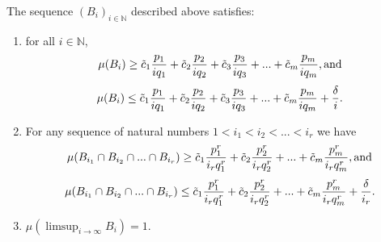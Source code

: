\documentclass[12pt]{article}
\begin{document}
\begin{lemma}\label{Bi lemma}
    The sequence $(B_i)_{i \in \mathbb{N}}$ described above satisfies: 
    \begin{enumerate}[label=(\roman*)]
    \item for all $i \in \mathbb{N}$,
    \[ \mu(B_i) \geq \Tilde{c}_1 \frac{p_1}{i q_1} + \Tilde{c}_2 \frac{p_2}{i q_2} + \Tilde{c}_3 \frac{p_3}{i q_3} + ... + \Tilde{c}_m \frac{p_m}{i q_m}, \text{and} \]
    \[\mu(B_i) \leq \Tilde{c}_1 \frac{p_1}{i q_1} + \Tilde{c}_2 \frac{p_2}{i q_2} + \Tilde{c}_3 \frac{p_3}{i q_3} + ... + \Tilde{c}_m \frac{p_m}{i q_m} + \frac{\delta}{i}.\]
     \item For any sequence of natural numbers $1<i_1<i_2<...<i_r$ we have
     \[\mu(B_{i_1} \cap B_{i_2} \cap ... \cap B_{i_r}) \geq \Tilde{c}_1 \frac{p_1^r}{i_r q_1^r} + \Tilde{c}_2 \frac{p_2^r}{i_r q_2^r} + ... + \Tilde{c}_m \frac{p_m^r}{i_r q_m^r}, \text{and}\]
     \[\mu(B_{i_1} \cap B_{i_2} \cap ... \cap B_{i_r}) \leq \Tilde{c}_1 \frac{p_1^r}{i_r q_1^r} + \Tilde{c}_2 \frac{p_2^r}{i_r q_2^r} + ... + \Tilde{c}_m \frac{p_m^r}{i_r q_m^r} + \frac{\delta}{i_r}.\]
     \item $\mu(\limsup_{i\rightarrow \infty}B_i) =1$.
    \end{enumerate}

\end{lemma}
\end{document}
